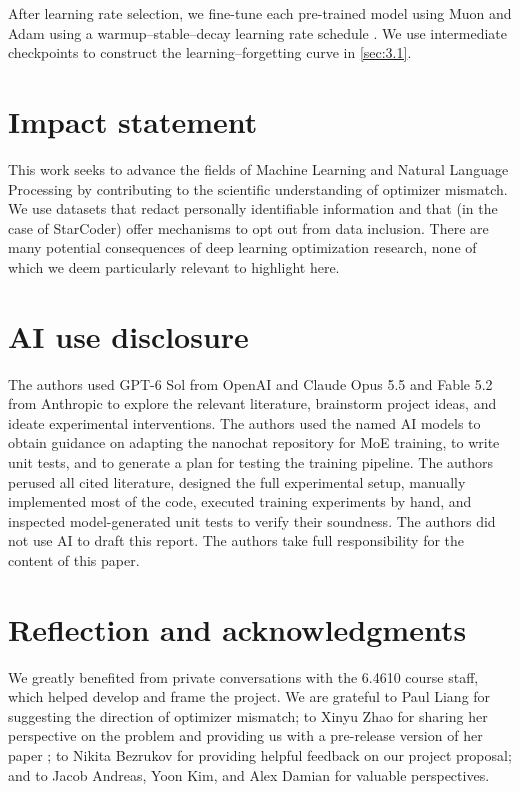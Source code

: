 \documentclass[11pt,a4paper]{article}
\begin{document}
After learning rate selection, we fine-tune each pre-trained model using Muon and Adam using a warmup--stable--decay learning rate schedule \cite{hu2024minicpmunveilingpotentialsmall}. We use intermediate checkpoints to construct the learning--forgetting curve in \ref{sec:3.1}.

\section{Impact statement}
This work seeks to advance the fields of Machine Learning and Natural Language Processing by contributing to the scientific understanding of optimizer mismatch. We use datasets that redact personally identifiable information and that (in the case of StarCoder) offer mechanisms to opt out from data inclusion. There are many potential consequences of deep learning optimization research, none of which we deem particularly relevant to highlight here.


\section{AI use disclosure}
\label{sec:ai}
The authors used GPT-6 Sol from OpenAI and Claude Opus 5.5 and Fable 5.2 from Anthropic to explore the relevant literature, brainstorm project ideas, and ideate experimental interventions. The authors used the named AI models to obtain guidance on adapting the nanochat repository for MoE training, to write unit tests, and to generate a plan for testing the training pipeline. The authors perused all cited literature, designed the full experimental setup, manually implemented most of the code, executed training experiments by hand, and inspected model-generated unit tests to verify their soundness. The authors did not use AI to draft this report. The authors take full responsibility for the content of this paper.

\section{Reflection and acknowledgments}
\label{sec:reflection}
We greatly benefited from private conversations with the 6.4610 course staff, which helped develop and frame the project. 
We are grateful to Paul Liang for suggesting the direction of optimizer mismatch; to Xinyu Zhao for sharing her perspective on the problem and providing us with a pre-release version of her paper \cite{zhao2026ephemeral}; to Nikita Bezrukov for providing 
helpful feedback on our project proposal; and to Jacob Andreas, Yoon Kim, and Alex Damian for valuable perspectives. 
\end{document}
